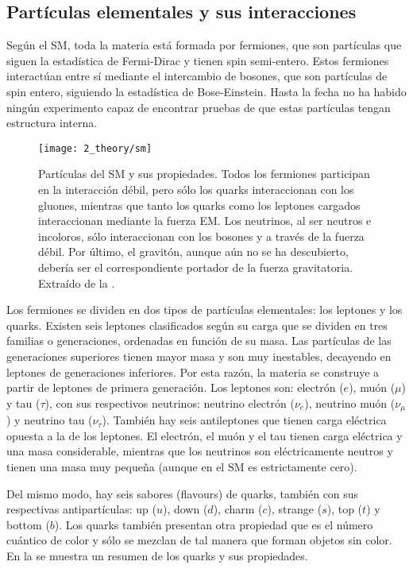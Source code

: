 \subsection{Partículas elementales y sus interacciones}
\label{subsec:theory:sm:particles_interaction}

Según el \ac{SM}, toda la materia está formada por fermiones, que son partículas que siguen la estadística de Fermi-Dirac y tienen spin semi-entero. Estos fermiones interactúan entre sí mediante el intercambio de bosones, que son partículas de spin entero, siguiendo la estadística de Bose-Einstein. Hasta la fecha no ha habido ningún experimento capaz de encontrar pruebas de que estas partículas tengan estructura interna.

\begin{figure}[ht!]
    \centering
    \texttt{[image: 2\_theory/sm]}
    \caption{Partículas del \ac{SM} y sus propiedades. Todos los fermiones participan en la interacción débil, pero sólo los quarks interaccionan con los gluones, mientras que tanto los quarks como los leptones cargados interaccionan mediante la fuerza \ac{EM}. Los neutrinos, al ser neutros e incoloros, sólo interaccionan con los bosones \Wboson y \Zboson a través de la fuerza débil. Por último, el gravitón, aunque aún no se ha descubierto, debería ser el correspondiente portador de la fuerza gravitatoria. Extraído de la .}
    \label{fig:theory:sm:particles_interaction:particles}
\end{figure}

Los fermiones se dividen en dos tipos de partículas elementales: los leptones y los quarks. Existen seis leptones clasificados según su carga que se dividen en tres familias o generaciones, ordenadas en función de su masa. Las partículas de las generaciones superiores tienen mayor masa y son muy inestables, decayendo en leptones de generaciones inferiores. Por esta razón, la materia se construye a partir de leptones de primera generación. Los leptones son: electrón (\(e\)), muón (\(\mu\)) y tau (\(\tau\)), con sus respectivos neutrinos: neutrino electrón (\(\nu_{e}\)), neutrino muón (\(\nu_{\mu}\)) y neutrino tau (\(\nu_{\tau}\)).
También hay seis antileptones que tienen carga eléctrica opuesta a la de los leptones. El electrón, el muón y el tau tienen carga eléctrica y una masa considerable, mientras que los neutrinos son eléctricamente neutros y tienen una masa muy pequeña (aunque en el \ac{SM} es estrictamente cero).

Del mismo modo, hay seis sabores (flavours) de quarks, también con sus respectivas antipartículas: up (\(u\)), down (\(d\)), charm (\(c\)), strange (\(s\)), top (\(t\)) y bottom (\(b\)). Los quarks también presentan otra propiedad que es el número cuántico de color y sólo se mezclan de tal manera que forman objetos sin color. En la \Fig{\ref{fig:theory:sm:particles_interaction:particles}} se muestra un resumen de los quarks y sus propiedades.


